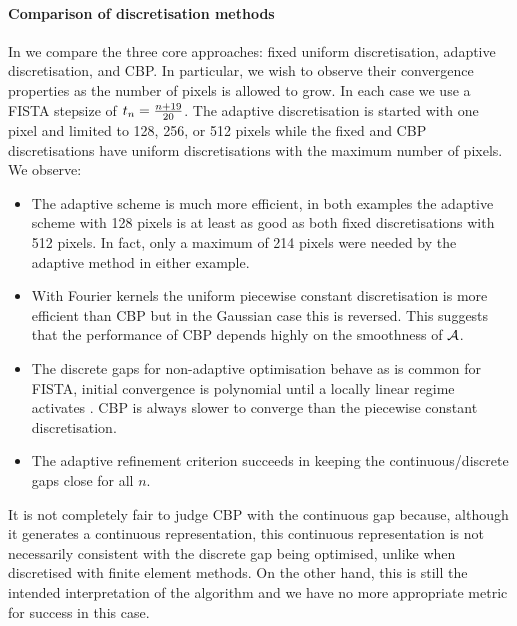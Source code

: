 \documentclass[10pt,a4paper,onecolumn]{article}
\numberwithin{equation}{section}
\newcommand*{\vart}[1]{%
	\IfEqCase{#1}{%
		{0}{s}%
		{1}{t}%
	}[t#1]%
}
\begin{document}
\paragraph{Comparison of discretisation methods}
In  we compare the three core approaches: fixed uniform
discretisation, adaptive discretisation, and CBP. In particular, we wish to observe their convergence properties as the number of pixels is allowed to grow. In each case we use a FISTA stepsize of $\vart1_n = \frac{n+19}{20}$. The adaptive discretisation is started with one pixel and limited to 128, 256, or 512 pixels while the fixed and CBP discretisations have uniform discretisations with the maximum number of pixels. We observe:
\begin{itemize}
	\item The adaptive scheme is much more efficient, in both examples the adaptive scheme with 128 pixels is at least as good as both fixed discretisations with 512 pixels. In fact, only a maximum of 214 pixels were needed by the adaptive method in either example.
	\item With Fourier kernels the uniform piecewise constant discretisation is more efficient than CBP but in the Gaussian case this is reversed. This suggests that the performance of CBP depends highly on the smoothness of $\mathcal{A}$.
	\item The discrete gaps for non-adaptive optimisation behave as is common for FISTA, initial convergence is polynomial until a locally linear regime activates \citep{Tao2016}. CBP is always slower to converge than the piecewise constant discretisation.
	\item The adaptive refinement criterion succeeds in keeping the continuous/discrete gaps close for all $n$.
\end{itemize}
It is not completely fair to judge CBP with the continuous gap because, although it generates a continuous representation, this continuous representation is not necessarily consistent with the discrete gap being optimised, unlike when discretised with finite element methods. On the other hand, this is still the intended interpretation of the algorithm and we have no more appropriate metric for success in this case.
\end{document}
